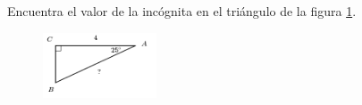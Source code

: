 \question[15]  Encuentra el valor de la incógnita en el triángulo de la figura \ref{fig:lados_functrig_30}.
\begin{figure}[H]
    \begin{center}
        \includegraphics[width=0.3\textwidth]{../images/lados_functrig_30.png}
    \end{center}
    \caption{}
    \label{fig:lados_functrig_30}
\end{figure}